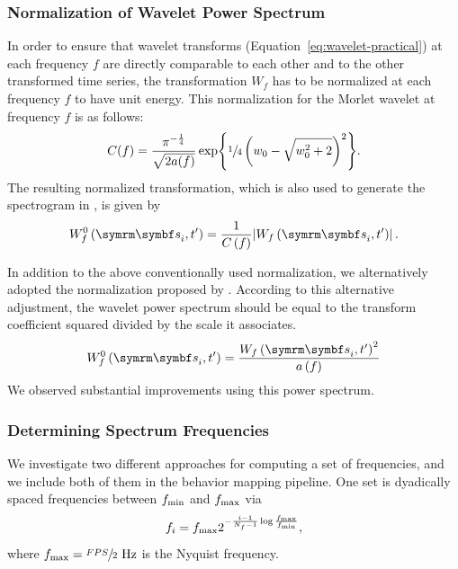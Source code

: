\subsubsection{Normalization of Wavelet Power Spectrum}
In order to ensure that wavelet transforms (Equation~\ref{eq:wavelet-practical}) at each frequency $f$ are directly comparable to each other and to the other transformed time series, the transformation $W_f$ has to be normalized at each frequency $f$ to have unit energy.
This normalization for the Morlet wavelet at frequency $f$ is as follows:
\begin{equation}
	C(f) = \frac{\pi^{-\frac{1}{4}}}{\sqrt{2a(f)}}\exp{\sfrac{1}{4}\left(w_0-\sqrt{w_0^2+2}\right)^2}.
\end{equation}
The resulting normalized transformation, which is also used to generate the spectrogram in \citet{berman_mapping_2014}, is given by
\begin{equation}
	W^0_f\rbr{\V{s}_i, t^\prime} = \frac{1}{C\rbr{f}} \abs*{W_f\rbr{\V{s}_i, t^\prime}}.
\end{equation}

In addition to the above conventionally used normalization, we alternatively adopted the normalization proposed by \citet{liu_rectification_2007}. According to this alternative adjustment, the wavelet power spectrum should be equal to the transform coefficient squared divided by the scale it associates.
\begin{equation}\label{equation:wavelet-normalization}
	W^{0}_f\rbr{\V{s}_i, t^\prime} = \frac{W_f\rbr{\V{s}_i, t^\prime}^2}{a\rbr{f}}
\end{equation}
We observed substantial improvements using this power spectrum.

\subsubsection{Determining Spectrum Frequencies}
We investigate two different approaches for computing a set of frequencies, and we include both of them in the behavior mapping pipeline.
One set is dyadically spaced frequencies between $f_{\textnormal{min}}$ and $f_{\textnormal{max}}$ via
\begin{equation}\label{equation:dyadically-spaced-spectrum}
	f_i = f_{\textnormal{max}} 2^{-\frac{i-1}{N_f-1}\log{\frac{f_{\textnormal{max}}}{f_{\textnormal{min}}}}},
\end{equation}
where $f_{\textnormal{max}} = \sfrac{FPS}{2} \textnormal{ Hz}$ is the Nyquist frequency.

